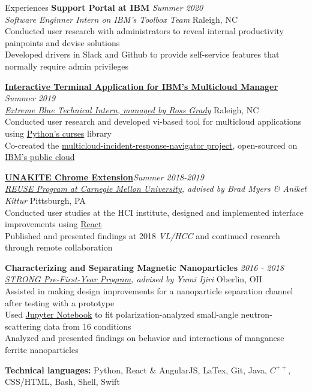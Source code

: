 \documentclass{resume}
\begin{document}
\begin{rSection}{Experiences}
{\bf Support Portal at IBM} \hfill  {\em Summer 2020} \\
{\it Software Enginner Intern on IBM's Toolbox Team} \hfill { Raleigh, NC} \\
{Conducted user research with administrators to reveal internal productivity painpoints and devise solutions} \\
{Developed drivers in Slack and Github to provide self-service features that normally require admin privileges}

\href{https://github.com/IBM/multicloud-incident-response-navigator}{\bf Interactive Terminal Application for IBM's Multicloud Manager} \hfill  {\em Summer 2019} \\
\href{https://www.ibm.com/employment/extremeblue/index.html}{\em Extreme Blue Technical Intern, managed by Ross Grady} \hfill { Raleigh, NC} \\
Conducted user research and developed vi-based tool for multicloud applications using \underline{Python's curses} library\\
{Co-created the \href{https://github.com/IBM/multicloud-incident-response-navigator}{multicloud-incident-response-navigator project}, open-sourced on \href{https://github.com/IBM/multicloud-incident-response-navigator}{IBM's public cloud}} 

{\bf \href{https://unakite.info/}{UNAKITE Chrome Extension}}\hfill {\em Summer 2018-2019} \\
{\em \href{https://www.cmu.edu/scs/isr/reuse/}{REUSE Program at Carnegie Mellon University}, advised by Brad Myers \& Aniket Kittur} \hfill { Pittsburgh, PA}\\
Conducted user studies at the HCI institute, designed and implemented interface improvements using \underline{React} \\
Published and presented findings at 2018 {\em VL/HCC} and continued research through remote collaboration

{\bf Characterizing and Separating Magnetic Nanoparticles } \hfill {\em 2016 - 2018}\\
{\em \href{https://www.oberlin.edu/undergraduate-research/programs/strong}{STRONG Pre-First-Year Program}, advised by Yumi Ijiri } \hfill { Oberlin, OH}\\
Assisted in making design improvements for a nanoparticle separation channel after testing with a prototype \\
Used \underline{Jupyter Notebook} to fit polarization-analyzed small-angle neutron-scattering data from 16 conditions \\
Analyzed and presented findings on behavior and interactions of manganese ferrite nanoparticles

 \textbf{Technical languages:} {Python, React \& AngularJS, LaTex, Git, Java, {$C^{++}$}, CSS/HTML, Bash, Shell, Swift}
\end{rSection}
\end{document}
